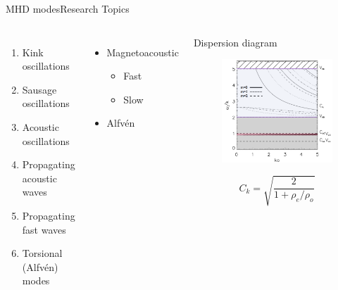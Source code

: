 \documentclass[11pt,table]{beamer}
\begin{document}
\begin{frame}{MHD modes}{Research Topics}
    \begin{columns}
        \begin{enumerate}
            \item Kink oscillations
            \item Sausage oscillations
            \item Acoustic oscillations
            \item Propagating acoustic waves
            \item Propagating fast waves
            \item Torsional (Alfv\'en) modes
        \end{enumerate}
        \begin{itemize}
            \item Magnetoacoustic
                \begin{itemize}
                    \item Fast %
                    \item Slow %
                \end{itemize}
            \item Alfv\'en
        \end{itemize}
        \begin{block}{\centering Dispersion diagram}
        \begin{figure}
            \includegraphics[width=\textwidth]{disp_diagram.png}
        \end{figure}
        $$ C_k = \sqrt{\frac{2}{1+\rho_e/\rho_o}}  $$
    \end{block}
    \end{columns}
\end{frame}%
\end{document}
